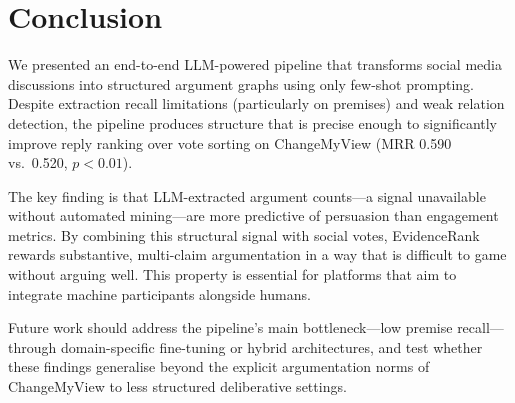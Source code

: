 
\section{Conclusion}

We presented an end-to-end LLM-powered pipeline that transforms social media discussions into structured argument graphs using only few-shot prompting. Despite extraction recall limitations (particularly on premises) and weak relation detection, the pipeline produces structure that is precise enough to significantly improve reply ranking over vote sorting on ChangeMyView (MRR 0.590 vs.\ 0.520, $p<0.01$).

The key finding is that LLM-extracted argument counts---a signal unavailable without automated mining---are more predictive of persuasion than engagement metrics. By combining this structural signal with social votes, EvidenceRank rewards substantive, multi-claim argumentation in a way that is difficult to game without arguing well. This property is essential for platforms that aim to integrate machine participants alongside humans.

Future work should address the pipeline's main bottleneck---low premise recall---through domain-specific fine-tuning or hybrid architectures, and test whether these findings generalise beyond the explicit argumentation norms of ChangeMyView to less structured deliberative settings.
